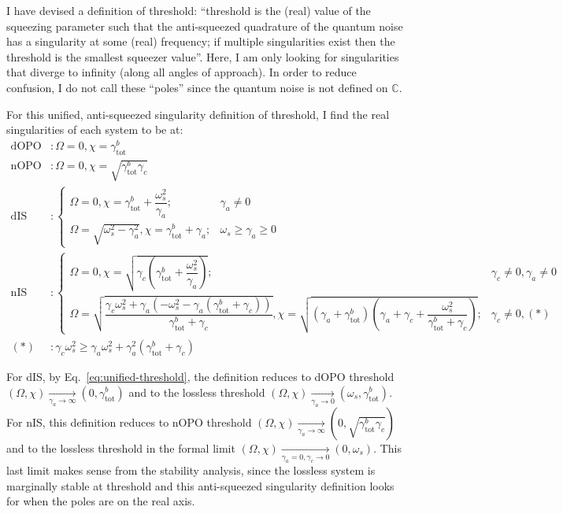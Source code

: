 I have devised a definition of threshold: ``threshold is the (real) value of the squeezing parameter such that the anti-squeezed quadrature of the quantum noise has a singularity at some (real) frequency; if multiple singularities exist then the threshold is the smallest squeezer value''. Here, I am only looking for singularities that diverge to infinity (along all angles of approach). In order to reduce confusion, I do not call these ``poles'' since the quantum noise is not defined on $\mathbb{C}$. 

For this unified, anti-squeezed singularity definition of threshold, I find the real singularities of each system to be at:
\begin{align}
\label{eq:unified-threshold}
\mathrm{dOPO}&: \Omega=0, \chi=\gamma^b_\mathrm{tot}\\
\mathrm{nOPO}&: \Omega=0, \chi=\sqrt{\gamma^b_\mathrm{tot}\gamma_c}\\
\mathrm{dIS}&:\begin{cases}
\Omega=0, \chi=\gamma^b_\mathrm{tot}+\dfrac{\omega_s^2}{\gamma_a};&\gamma_a\neq0\\
\Omega=\sqrt{\omega_s^2-\gamma_a^2}, \chi=\gamma^b_\mathrm{tot}+\gamma_a;&\omega_s\geq\gamma_a\geq0
\end{cases}\\
\mathrm{nIS}&:\begin{cases}
\Omega=0, \chi=\sqrt{\gamma_c(\gamma^b_\mathrm{tot}+\dfrac{\omega_s^2}{\gamma_a})};&\gamma_c\neq0,\gamma_a\neq0\\
\Omega=\sqrt{\dfrac{\gamma_c\omega_s^2+\gamma_a(-\omega_s^2-\gamma_a(\gamma^b_\mathrm{tot}+\gamma_c))}{\gamma^b_\mathrm{tot}+\gamma_c}}, \chi=\sqrt{(\gamma_a+\gamma^b_\mathrm{tot})(\gamma_a+\gamma_c+\dfrac{\omega_s^2}{\gamma^b_\mathrm{tot}+\gamma_c})};&\gamma_c\neq0,(*)
\end{cases}\\
(*)&:\gamma_c\omega_s^2\geq\gamma_a\omega_s^2+\gamma_a^2(\gamma^b_\mathrm{tot}+\gamma_c)
\end{align}

For dIS, by Eq.~\ref{eq:unified-threshold}, the definition reduces to dOPO threshold $(\Omega,\chi)\xrightarrow[\gamma_a\rightarrow\infty]{}(0,\gamma^b_\mathrm{tot})$ and to the lossless threshold $(\Omega,\chi)\xrightarrow[\gamma_a\rightarrow0]{}(\omega_s,\gamma^b_\mathrm{tot})$.
For nIS, this definition reduces to nOPO threshold $(\Omega,\chi)\xrightarrow[\gamma_a\rightarrow\infty]{}(0,\sqrt{\gamma^b_\mathrm{tot}\gamma_c})$ and to the lossless threshold in the formal limit $(\Omega,\chi)\xrightarrow[\gamma_a=0,\gamma_c\rightarrow0]{}(0,\omega_s)$. This last limit makes sense from the stability  analysis, since the lossless system is marginally stable at threshold and this anti-squeezed singularity definition looks for when the poles are on the real axis.

